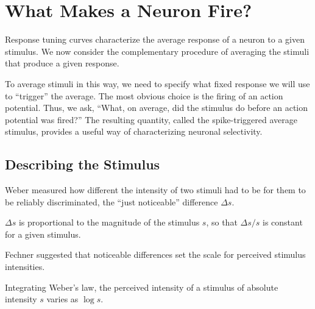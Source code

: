 \section{What Makes a Neuron Fire?}
\label{sec:what-makes-a-neuron-fire}

\begin{rem}
  Response tuning curves characterize the average response of a neuron to a given stimulus. We now consider the complementary procedure of averaging the stimuli that produce a given response.  
\end{rem}
\begin{rem}
  To average stimuli in this way, we need to specify what fixed response we will use to “trigger” the average. The most obvious choice is the firing of an action potential. Thus, we ask, “What, on average, did the stimulus do before an action potential was fired?” The resulting quantity, called the spike-triggered average stimulus, provides a useful way of characterizing neuronal selectivity.
\end{rem}

\subsection{Describing the Stimulus}
\begin{ntn}
  \label{defn:noticeable difference}
  Weber measured how different the intensity of two stimuli had to be for them to be reliably discriminated, the “just noticeable” difference $\Delta{s}$.  
\end{ntn}
\begin{prin}
  \label{prin:Weber's law}
  $\Delta{s}$ is proportional to the magnitude of the stimulus $s$, so that $\Delta{s}/s$ is constant for a given stimulus.
\end{prin}

\begin{rem}
  Fechner suggested that noticeable differences set the scale for perceived stimulus intensities.%
\end{rem}

\begin{prin}
  \label{prin:Fechner's law}
  Integrating Weber's law, the perceived intensity of a stimulus of absolute intensity $s$ varies as $\log{s}$.
\end{prin}

